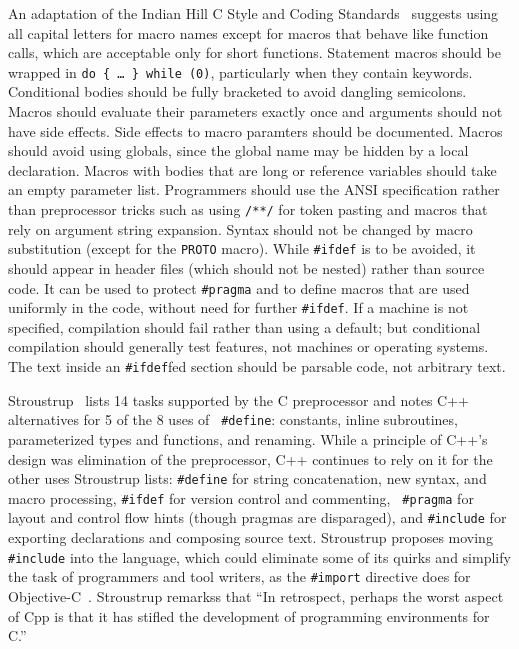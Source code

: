 \documentclass[10pt]{article}
\begin{document}
An adaptation of the Indian Hill C Style and Coding
Standards~\cite{Cannon90} suggests using all capital letters for macro
names except for macros that behave like function calls, which are
acceptable only for short functions.  Statement macros should be wrapped in
{\tt do \{ \ldots{} \} while (0)}, particularly when they contain keywords.
Conditional bodies should be fully bracketed to avoid dangling semicolons.
Macros should evaluate their parameters exactly once and arguments should
not have side effects.  Side effects to macro paramters should be
documented.  Macros should avoid using globals, since the global name may
be hidden by a local declaration.  Macros with bodies that are long or
reference variables should take an empty parameter list.  Programmers
should use the ANSI specification rather than preprocessor tricks such as
using {\tt /**/} for token pasting and macros that rely on argument string
expansion.  Syntax should not be changed by macro substitution (except for
the {\tt PROTO} macro).  While {\tt \#ifdef} is to be avoided, it should
appear in header files (which should not be nested) rather than source
code.  It can be used to protect {\tt \#pragma} and to define macros that
are used uniformly in the code, without need for further {\tt \#ifdef}.  If
a machine is not specified, compilation should fail rather than using a
default; but conditional compilation should generally test features, not
machines or operating systems.  The text inside an {\tt \#ifdef}fed section
should be parsable code, not arbitrary text.

Stroustrup~\cite{Stroustrup-DesignEvolution} lists 14 tasks supported by
the C preprocessor and notes C++ alternatives for 5 of the 8 uses of {\tt
\#define}:  constants, inline subroutines, parameterized types and
functions, and renaming.  While a principle of C++'s design was elimination
of the preprocessor, C++ continues to rely on it for the other uses
Stroustrup lists:  {\tt \#define} for string concatenation, new syntax, and
macro processing, {\tt \#ifdef} for version control and commenting, {\tt
\#pragma} for layout and control flow hints (though pragmas are
disparaged), and {\tt \#include} for exporting declarations and composing
source text.  Stroustrup proposes moving {\tt \#include} into the language,
which could eliminate some of its quirks and simplify the task of
programmers and tool writers, as the {\tt \#import} directive does for
Objective-C~\cite{CoxN91}.  Stroustrup remarkss that ``In retrospect,
perhaps the worst aspect of Cpp is that it has stifled the development of
programming environments for C.''
\end{document}
